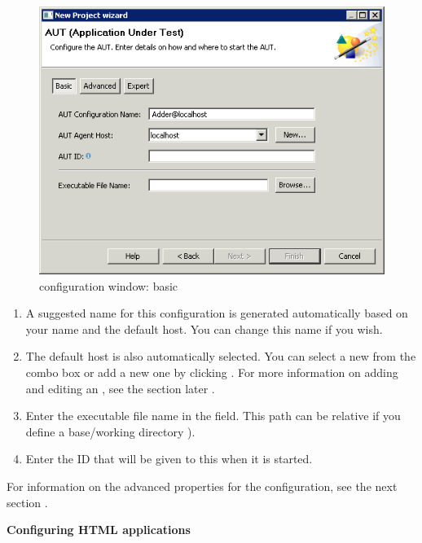 \begin{figure}[h]
\begin{center}
\includegraphics{Tasks/AUTs/PS/autconfigwindow_basic}
\caption{\gdaut configuration window: basic}
\label{autconfigbasic}
\end{center}
\end{figure}

\begin{enumerate}
\item A suggested name for this \gdaut{} configuration is generated automatically based on your \gdaut{} name and the default \gdagent{} host. You can change this name if you wish. 
\item The default \gdagent host is also automatically selected. You can select a new \gdagent{} from the combo box or add a new one by clicking . For more information on adding and editing an \gdagent{}, see the section later .

\item Enter the executable file name in the  field. This path can be relative if you define a base/working directory ).
\item Enter the \gdaut{} ID that will be given to this \gdaut{} when it is started.  
\end{enumerate}
For information on the advanced properties for the \gdaut{} configuration, see the next section . 

\textbf{Configuring HTML applications}\\


